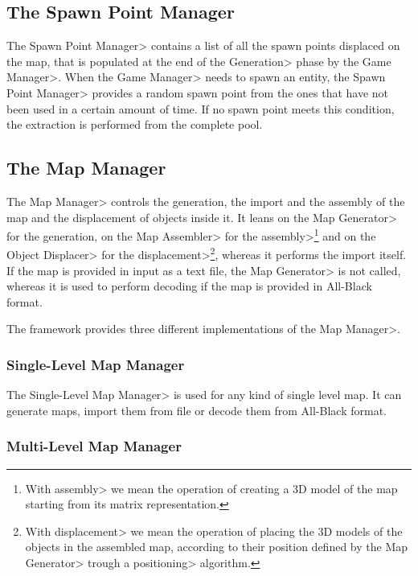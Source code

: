 
\subsection{The Spawn Point Manager}

The \<Spawn Point Manager> contains a list of all the spawn points displaced on the map, that is populated at the end of the \<Generation> phase by the \<Game Manager>. When the \<Game Manager> needs to spawn an entity, the \<Spawn Point Manager> provides a random spawn point from the ones that have not been used in a certain amount of time. If no spawn point meets this condition, the extraction is performed from the complete pool.


\subsection{The Map Manager}

The \<Map Manager> controls the generation, the import and the assembly of the map and the displacement of objects inside it. It leans on the \<Map Generator> for the generation, on the \<Map Assembler> for the \<assembly>\footnote{With \<assembly> we mean the operation of creating a 3D model of the map starting from its matrix representation.} and on the \<Object Displacer> for the \<displacement>\footnote{With \<displacement> we mean the operation of placing the 3D models of the objects in the assembled map, according to their position defined by the \<Map Generator> trough a \<positioning> algorithm.}, whereas it performs the import itself. If the map is provided in input as a text file, the \<Map Generator> is not called, whereas it is used to perform decoding if the map is provided in All-Black format.

\par

The framework provides three different implementations of the \<Map Manager>.

\subsubsection{Single-Level Map Manager}

The \<Single-Level Map Manager> is used for any kind of single level map. It can generate maps, import them from file or decode them from All-Black format.

\subsubsection{Multi-Level Map Manager}


